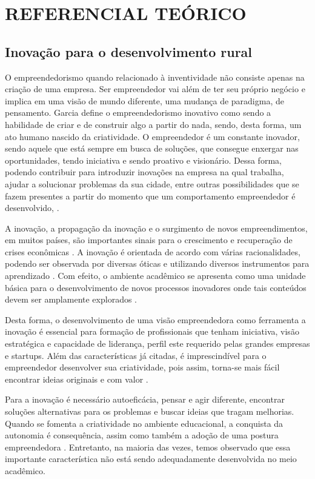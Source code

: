\chapter{REFERENCIAL TEÓRICO}


\section{Inovação para o desenvolvimento rural}

O empreendedorismo quando relacionado à inventividade não consiste apenas na criação de uma empresa. Ser empreendedor vai além de ter seu próprio negócio e implica em uma visão de mundo diferente, uma mudança de paradigma, de pensamento. Garcia \cite{garcia_formacao_2000} define o empreendedorismo inovativo como sendo a habilidade de criar e de construir algo a partir do nada, sendo, desta forma, um ato humano nascido da criatividade. O empreendedor é um constante inovador, sendo aquele que está sempre em busca de soluções, que consegue enxergar nas oportunidades, tendo iniciativa e sendo proativo e visionário. Dessa forma, podendo contribuir para introduzir inovações na empresa na qual trabalha, ajudar a solucionar problemas da sua cidade, entre outras possibilidades que se fazem presentes a partir do momento que um comportamento empreendedor é desenvolvido, \cite{alencar_intencao_2019, loiola_cao_2016}.

A inovação, a propagação da inovação e o surgimento de novos empreendimentos, em muitos países, são importantes sinais para o crescimento e recuperação de crises econômicas \cite{silva_educacao_2017}. A inovação é orientada de acordo com várias racionalidades, podendo ser observada por diversas óticas e utilizando diversos instrumentos para aprendizado \cite{munoz_innovacion_2016}. Com efeito, o ambiente acadêmico se apresenta como uma unidade básica para o desenvolvimento de novos processos inovadores onde tais conteúdos devem ser amplamente explorados \cite{costa_inovacao_2017}. 

Desta forma, o desenvolvimento de uma visão empreendedora como ferramenta a inovação é essencial para formação de profissionais que tenham iniciativa, visão estratégica e capacidade de liderança, perfil este requerido pelas grandes empresas e startups. Além das características já citadas, é imprescindível para o empreendedor desenvolver sua criatividade, pois assim, torna-se mais fácil encontrar ideias originais e com valor \cite{macedo_capital_2019}. 

Para a inovação é necessário autoeficácia, pensar e agir diferente, encontrar soluções alternativas para os problemas e buscar ideias que tragam melhorias. Quando se fomenta a criatividade no ambiente educacional, a conquista da autonomia é consequência, assim como também a adoção de uma postura empreendedora \cite{gonzalez_predictors_2009}. Entretanto, na maioria das vezes, temos observado que essa importante característica não está sendo adequadamente desenvolvida no meio acadêmico. 


